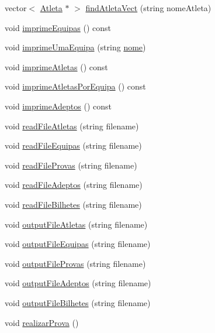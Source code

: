 \begin{DoxyCompactItemize}
vector$<$ \hyperlink{class_atleta}{Atleta} $\ast$ $>$ \hyperlink{class_campeonato_abe0557f6d0fe33787a6d44e85fd8bda3}{find\+Atleta\+Vect} (string nome\+Atleta)
\item 
void \hyperlink{class_campeonato_a9e43dc72a8bf29c332209a37a8bdb1d8}{imprime\+Equipas} () const 
\item 
void \hyperlink{class_campeonato_aad257942dd3f514d80fd8a9292dd03e2}{imprime\+Uma\+Equipa} (string \hyperlink{class_campeonato_a670b0857b7a8bc3c5dbf0f927ee192fe}{nome})
\item 
void \hyperlink{class_campeonato_a6a51ed1d4c6ca51bdc407144589d5894}{imprime\+Atletas} () const 
\item 
void \hyperlink{class_campeonato_a4bbcc137067e9f72c169e22ce1c28858}{imprime\+Atletas\+Por\+Equipa} () const 
\item 
void \hyperlink{class_campeonato_aae7fd3818bfccc73a9e91bb6eea79849}{imprime\+Adeptos} () const 
\item 
void \hyperlink{class_campeonato_a4f443b1fb65733062b40dd529d5ad63e}{read\+File\+Atletas} (string filename)
\item 
void \hyperlink{class_campeonato_a93f60ccc2608b0c99a978bc93fd881ac}{read\+File\+Equipas} (string filename)
\item 
void \hyperlink{class_campeonato_a4098bb3bde66ead9ecaa61e10aef2a5e}{read\+File\+Provas} (string filename)
\item 
void \hyperlink{class_campeonato_a24e83e8edd6fe99fbb834a15110ec6e8}{read\+File\+Adeptos} (string filename)
\item 
void \hyperlink{class_campeonato_a7cd0e87a1ca591e77af05efcf0614b1e}{read\+File\+Bilhetes} (string filename)
\item 
void \hyperlink{class_campeonato_acef3bbad2dd3afaf348a888fa2ee8b4c}{output\+File\+Atletas} (string filename)
\item 
void \hyperlink{class_campeonato_a6b641747f988d0498046d1e906595d13}{output\+File\+Equipas} (string filename)
\item 
void \hyperlink{class_campeonato_ac3e2f507c842cde6b2f0f248bb567084}{output\+File\+Provas} (string filename)
\item 
void \hyperlink{class_campeonato_abd4a9d696a620dedca6fe1bcf7e9b7a1}{output\+File\+Adeptos} (string filename)
\item 
void \hyperlink{class_campeonato_a45c704af5fba03ef472107810e51ddd0}{output\+File\+Bilhetes} (string filename)
\item 
void \hyperlink{class_campeonato_a53c1d1469c287bcdff0469cd3785d9f2}{realizar\+Prova} ()

\end{DoxyCompactItemize}
